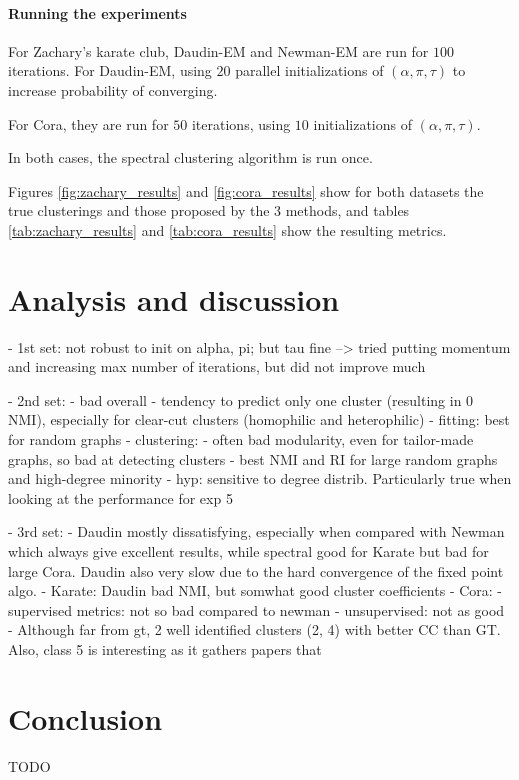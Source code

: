 \documentclass[switch, 12pt]{article}
\begin{document}
\begin{multicols}{2}
    \paragraph{Running the experiments} For Zachary's karate club, Daudin-EM and Newman-EM are run for $100$ iterations. For Daudin-EM, using $20$ parallel initializations of $(\alpha, \pi, \tau)$ to increase probability of converging.

    For Cora, they are run for $50$ iterations, using $10$ initializations of $(\alpha, \pi, \tau)$.

    In both cases, the spectral clustering algorithm is run once.

    Figures \ref{fig:zachary_results} and \ref{fig:cora_results} show for both datasets the true clusterings and those proposed by the 3 methods, and tables \ref{tab:zachary_results} and \ref{tab:cora_results} show the resulting metrics.






    \section{Analysis and discussion}
    \label{sec:discussion}

    - 1st set: not robust to init on alpha, pi; but tau fine --> tried putting momentum and increasing max number of iterations, but did not improve much

    - 2nd set:
    - bad overall
    - tendency to predict only one cluster (resulting in 0 NMI), especially for clear-cut clusters (homophilic and heterophilic)
    - fitting: best for random graphs
    - clustering:
    - often bad modularity, even for tailor-made graphs, so bad at detecting clusters
    - best NMI and RI for large random graphs and high-degree minority
    - hyp: sensitive to degree distrib. Particularly true when looking at the performance for exp 5

    - 3rd set:
    - Daudin mostly dissatisfying, especially when compared with Newman which always give excellent results, while spectral good for Karate but bad for large Cora. Daudin also very slow due to the hard convergence of the fixed point algo.
    - Karate: Daudin bad NMI, but somwhat good cluster coefficients
    - Cora:
    - supervised metrics: not so bad compared to newman
    - unsupervised: not as good
    - Although far from gt, 2 well identified clusters (2, 4) with better CC than GT. Also, class 5 is interesting as it gathers papers that


    \section{Conclusion}
    \label{sec:conclusion}

    TODO

    

\end{multicols}
\end{document}
